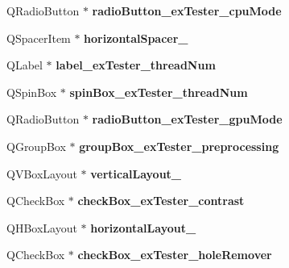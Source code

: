 \begin{DoxyCompactItemize}
\item 
\mbox{\label{class_ui___main_window_a2b808fbfe414977ad3414f3f2f87cd90}} 
Q\+Radio\+Button $\ast$ {\bfseries radio\+Button\+\_\+ex\+Tester\+\_\+cpu\+Mode}
\item 
\mbox{\label{class_ui___main_window_ae68be49729f967fb48d4c6ed6531a1f8}} 
Q\+Spacer\+Item $\ast$ {\bfseries horizontal\+Spacer\+\_}
\item 
\mbox{\label{class_ui___main_window_a66ae2540fd4ed05dfabd0e39bf203aac}} 
Q\+Label $\ast$ {\bfseries label\+\_\+ex\+Tester\+\_\+thread\+Num}
\item 
\mbox{\label{class_ui___main_window_a44d0dd909ab21f0c4cb53adee59ff627}} 
Q\+Spin\+Box $\ast$ {\bfseries spin\+Box\+\_\+ex\+Tester\+\_\+thread\+Num}
\item 
\mbox{\label{class_ui___main_window_a53c7e4a9391bb5d935513805c3e01f8f}} 
Q\+Radio\+Button $\ast$ {\bfseries radio\+Button\+\_\+ex\+Tester\+\_\+gpu\+Mode}
\item 
\mbox{\label{class_ui___main_window_acd833eb9cc05d286985e4bb54f49fcce}} 
Q\+Group\+Box $\ast$ {\bfseries group\+Box\+\_\+ex\+Tester\+\_\+preprocessing}
\item 
\mbox{\label{class_ui___main_window_a49ce38bc5254273d965fbe2a46fb758d}} 
Q\+V\+Box\+Layout $\ast$ {\bfseries vertical\+Layout\+\_}
\item 
\mbox{\label{class_ui___main_window_a9b1f040c96554321bb80345bed5eade6}} 
Q\+Check\+Box $\ast$ {\bfseries check\+Box\+\_\+ex\+Tester\+\_\+contrast}
\item 
\mbox{\label{class_ui___main_window_a59a5c1672f6a8374f7195620d3a76100}} 
Q\+H\+Box\+Layout $\ast$ {\bfseries horizontal\+Layout\+\_}
\item 
\mbox{\label{class_ui___main_window_a9046be0ad494d2c31ec3021b90ce2948}} 
Q\+Check\+Box $\ast$ {\bfseries check\+Box\+\_\+ex\+Tester\+\_\+hole\+Remover}

\end{DoxyCompactItemize}
